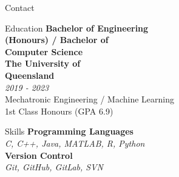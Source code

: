 \documentclass{minimal-resume}
\begin{document}
\selectfont


\TitleRule


\begin{minipage}[t]{0.25\textwidth}

  \raggedright


  \begin{section}{Contact}
  \end{section}

  \SectionRule


  \begin{section}{Education}
    {
      \small
      \textbf{Bachelor of Engineering\\ (Honours) / Bachelor of\\ Computer Science}
    } \\[1em]
    {
      \large
      \textbf{The University of\\ Queensland} \\[1em]
    }
    \textit{2019 - 2023} \\[1em]
    Mechatronic Engineering / Machine Learning \\[1em]
    1st Class Honours (GPA 6.9)
  \end{section}

  \SectionRule


  \begin{section}{Skills}
    \textbf{Programming Languages} \\[2pt]
    \textit{C, C++, Java, MATLAB, R, Python} \\[8pt]

    \textbf{Version Control} \\[2pt]
    \textit{Git, GitHub, GitLab, SVN} \\[8pt]


\end{section}
\end{minipage}
\end{document}
